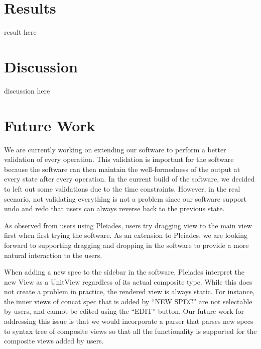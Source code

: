 \documentclass[journal]{vgtc}                %
\begin{document}
\section{Results}

result here

\section{Discussion}

discussion here

\section{Future Work}
We are currently working on extending our software to perform a better validation
of every operation. This validation is important for the software because the
software can then maintain the well-formedness of the output at every state after
every operation. In the current build of the software, we decided to left out some
validations due to the time constraints. However, in the real scenario, not validating
everything is not a problem since our software support undo and redo that users
can always reverse back to the previous state.

As observed from users using Pleiades, users try dragging view to the main view
first when first trying the software. As an extension to Pleiades, we are looking
forward to supporting dragging and dropping in the software to provide a more natural
interaction to the users.

When adding a new spec to the sidebar in the software, Pleiades interpret the new
View as a UnitView regardless of its actual composite type. While this does not
create a problem in practice, the rendered view is always static. For instance,
the inner views of concat spec that is added by “NEW SPEC” are not selectable by
users, and cannot be edited using the “EDIT” button.  Our future work for addressing
this issue is that we would incorporate a parser that parses new specs to syntax tree
of composite views so that all the functionality is supported for the composite
views added by users.




\end{document}
